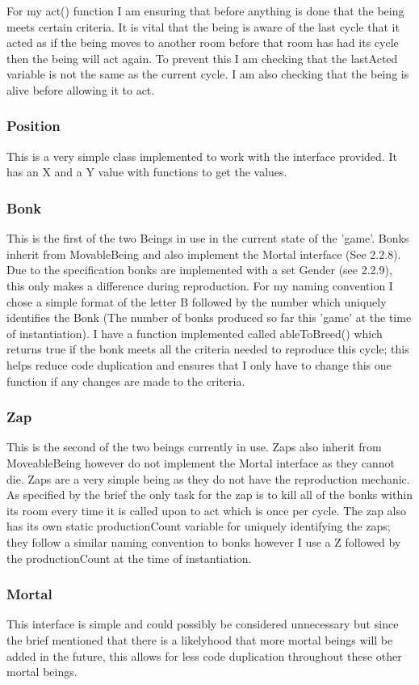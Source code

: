 \documentclass[12pt]{article}
\begin{document}
For my act() function I am ensuring that before anything is done that the being meets certain criteria. It is vital that the being is aware of the last cycle that it acted as if the being moves to another room before that room has had its cycle then the being will act again. To prevent this I am checking that the lastActed variable is not the same as the current cycle. I am also checking that the being is alive before allowing it to act. 
\subsubsection{Position}
This is a very simple class implemented to work with the interface provided. It has an X and a Y value with functions to get the values.
\subsubsection{Bonk}
This is the first of the two Beings in use in the current state of the 'game'. Bonks inherit from MovableBeing and also implement the Mortal interface (See 2.2.8). Due to the specification bonks are implemented with a set Gender (see 2.2.9), this only makes a difference during reproduction. For my naming convention I chose a simple format of the letter B followed by the number which uniquely identifies the Bonk (The number of bonks produced so far this 'game' at the time of instantiation). I have a function implemented called ableToBreed() which returns true if the bonk meets all the criteria needed to reproduce this cycle; this helps reduce code duplication and ensures that I only have to change this one function if any changes are made to the criteria.

\subsubsection{Zap}
This is the second of the two beings currently in use. Zaps also inherit from MoveableBeing however do not implement the Mortal interface as they cannot die. Zaps are a very simple being as they do not have the reproduction mechanic. As specified by the brief the only task for the zap is to kill all of the bonks within its room every time it is called upon to act which is once per cycle. The zap also has its own static productionCount variable for uniquely identifying the zaps; they follow a similar naming convention to bonks however I use a Z followed by the productionCount at the time of instantiation.
\subsubsection{Mortal}
This interface is simple and could possibly be considered unnecessary but since the brief mentioned that there is a likelyhood that more mortal beings will be added in the future, this allows for less code duplication throughout these other mortal beings.\\
\end{document}
